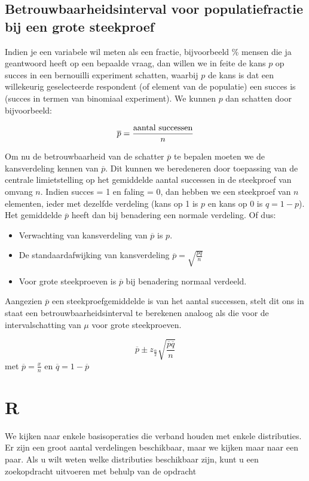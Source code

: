\subsection{Betrouwbaarheidsinterval voor populatiefractie bij een grote steekproef}
\label{ssec:betrouwbaarheidsinterval-populatiefractie}

Indien je een variabele wil meten als een fractie, bijvoorbeeld \% mensen die ja geantwoord heeft op een bepaalde vraag, dan willen we in feite de kans $p$ op succes in een bernouilli experiment schatten, waarbij $p$ de kans is dat een willekeurig geselecteerde respondent (of element van de populatie) een succes is (succes in termen van binomiaal experiment). We kunnen $p$ dan schatten door bijvoorbeeld:

\[ \overline{p} = \frac{\textnormal{aantal successen}}{n} \]

Om nu de betrouwbaarheid van de schatter $\overline{p}$ te bepalen moeten we de kansverdeling kennen van $\overline{p}$. Dit kunnen we beredeneren door toepassing van de centrale limietstelling op het gemiddelde aantal successen in de steekproef van omvang $n$. Indien succes = 1 en faling = 0, dan hebben we een steekproef van $n$ elementen, ieder met dezelfde verdeling (kans op 1 is $p$ en kans op 0 is $q=1-p$).  Het gemiddelde $\overline{p}$ heeft dan bij benadering een normale verdeling. Of dus:

\begin{itemize}
  \item Verwachting van kansverdeling van $\overline{p}$ is $p$.
  \item De standaardafwijking van kansverdeling $\overline{p} = \sqrt{\frac{pq}{n}}$
  \item Voor grote steekproeven is $\overline{p}$ bij benadering normaal verdeeld.
\end{itemize}

Aangezien $\overline{p}$ een steekproefgemiddelde is van het aantal successen, stelt dit ons in staat een betrouwbaarheidsinterval te berekenen analoog als die voor de intervalschatting van $\mu$ voor grote steekproeven.

\begin{definition}
  \[ \overline{p} \pm z_{\frac{\alpha}{2}} \sqrt{\frac{\overline{p}\overline{q}}{n}} \]
  met $\overline{p} = \frac{x}{n}$ en $\overline{q} = 1- \overline{p}$
\end{definition}


\section{R}
We kijken naar enkele basisoperaties die verband houden met enkele distributies. Er zijn een groot aantal verdelingen beschikbaar, maar we kijken maar naar een paar. Als u wilt weten welke distributies beschikbaar zijn, kunt u een zoekopdracht uitvoeren met behulp van de opdracht

